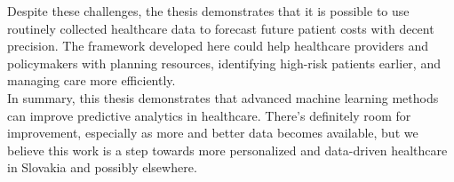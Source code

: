Despite these challenges, the thesis demonstrates that it is possible to use routinely collected healthcare data to forecast future patient costs with decent precision. The framework developed here could help healthcare providers and policymakers with planning resources, identifying high-risk patients earlier, and managing care more efficiently.
\\

In summary, this thesis demonstrates that advanced machine learning methods can improve predictive analytics in healthcare. There’s definitely room for improvement, especially as more and better data becomes available, but we believe this work is a step towards more personalized and data-driven healthcare in Slovakia and possibly elsewhere.


